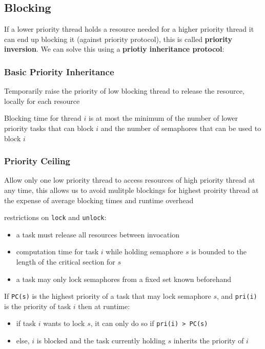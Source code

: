\documentclass[]{article}
\theoremstyle{definition}
\begin{document}
	\subsection{Blocking}
	If a lower priority thread holds a resource needed for a higher priority thread it can end up blocking it (against priority protocol), this is called \textbf{priority inversion}. We can solve this using a \textbf{priotiy inheritance protocol}:

	\subsubsection{Basic Priority Inheritance} 
	Temporarily raise the priority of low blocking thread to release the resource, locally for each resource

	Blocking time for thread $i$ is at most the minimum of the number of lower priority tasks that can block $i$ and the number of semaphores that can be used to block $i$

	\subsubsection{Priority Ceiling} 
	Allow only one low priority thread to access resources of high priority thread at any time, this allows us to avoid mulitple blockings for highest proirity thread at the expense of average blocking times and runtime overhead

	restrictions on \lstinline|lock| and \lstinline|unlock|:
	\begin{itemize}
		\item a task must release all resources between invocation
		\item computation time for task $i$ while holding semaphore $s$ is bounded to the length of the critical section for $s$
		\item a task may only lock semaphores from a fixed set known beforehand
	\end{itemize}

	If \lstinline|PC(s)| is the highest priority of a task that may lock semaphore $s$, and \lstinline|pri(i)| is the priority of task $i$ then at runtime:
	\begin{itemize}
		\item if task $i$ wants to lock $s$, it can only do so if \lstinline|pri(i) > PC(s)|
		\item else, $i$ is blocked and the task currently holding $s$ inherits the priority of $i$
	\end{itemize}
\end{document}
